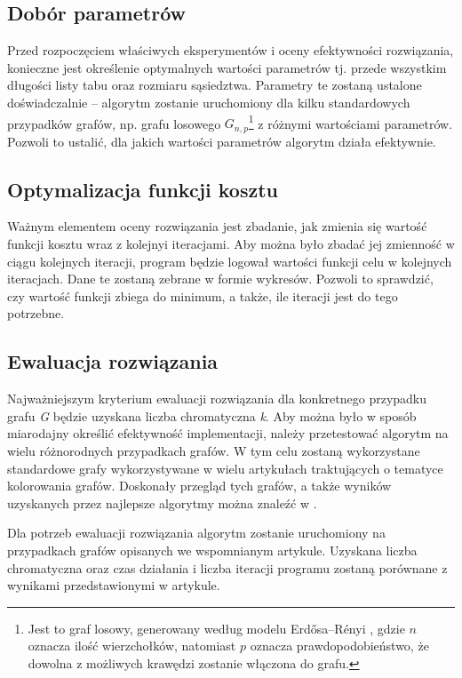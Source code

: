 \documentclass[12pt,a4paper]{article}
\begin{document}
\subsection{Dobór parametrów}
Przed rozpoczęciem właściwych eksperymentów i oceny efektywności rozwiązania, konieczne jest określenie optymalnych wartości parametrów tj. przede wszystkim długości listy tabu oraz rozmiaru sąsiedztwa. Parametry te zostaną ustalone doświadczalnie – algorytm zostanie uruchomiony dla kilku standardowych przypadków grafów, np. grafu losowego $G_{n,p}$\footnote{Jest to graf losowy, generowany według modelu Erdősa–Rényi \cite{erdos59a}, gdzie $n$ oznacza ilość wierzchołków, natomiast $p$ oznacza prawdopodobieństwo, że dowolna z możliwych krawędzi zostanie włączona do grafu.} z różnymi wartościami parametrów. Pozwoli to ustalić, dla jakich wartości parametrów algorytm działa efektywnie.

\subsection{Optymalizacja funkcji kosztu}
Ważnym elementem oceny rozwiązania jest zbadanie, jak zmienia się wartość funkcji kosztu wraz z kolejnyi iteracjami. Aby można było zbadać jej zmienność w ciągu kolejnych iteracji, program będzie logował wartości funkcji celu w kolejnych iteracjach. Dane te zostaną zebrane w formie wykresów. Pozwoli to sprawdzić, czy wartość funkcji zbiega do minimum, a także, ile iteracji jest do tego potrzebne.

\subsection{Ewaluacja rozwiązania}
\label{ssec:eval}
Najważniejszym kryterium ewaluacji rozwiązania dla konkretnego przypadku grafu \textit{G} będzie uzyskana liczba chromatyczna \textit{k}. Aby można było w sposób miarodajny określić efektywność implementacji, należy przetestować algorytm na wielu różnorodnych przypadkach grafów. W tym celu zostaną wykorzystane standardowe grafy wykorzystywane w wielu artykułach traktujących o tematyce kolorowania grafów. Doskonały przegląd tych grafów, a także wyników uzyskanych przez najlepsze algorytmy można znaleźć w \cite{article}.

Dla potrzeb ewaluacji rozwiązania algorytm zostanie uruchomiony na przypadkach grafów opisanych we wspomnianym artykule. Uzyskana liczba chromatyczna oraz czas działania i liczba iteracji programu zostaną porównane z wynikami przedstawionymi w artykule.
\end{document}
